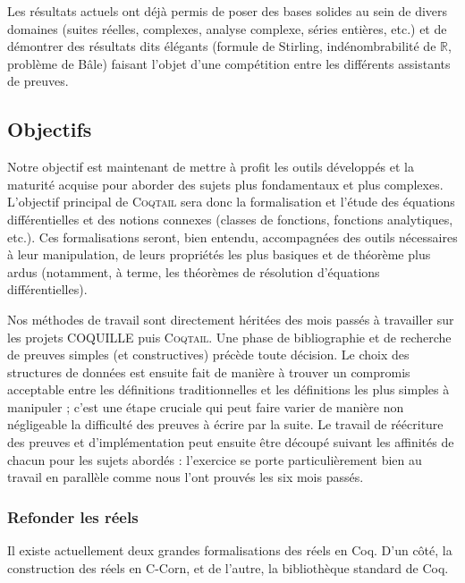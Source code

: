 \documentclass[11pt]{article}
\newcommand{\coqtail}{\textsc{Coqtail}}
\begin{document}
Les résultats actuels ont déjà permis de poser des bases solides au sein de divers domaines (suites réelles, complexes, analyse complexe, séries entières, etc.) et de démontrer des résultats dits élégants (formule de Stirling, indénombrabilité de $\mathbb{R}$, problème de Bâle) faisant l'objet d'une compétition entre les différents assistants de preuves\cite{Freek}.


\subsection{Objectifs}

Notre objectif est maintenant de mettre à profit les outils développés et la maturité acquise pour aborder des sujets plus fondamentaux et plus complexes. L'objectif principal de \coqtail{} sera donc la formalisation et l'étude des équations différentielles et des notions connexes (classes de fonctions, fonctions analytiques, etc.). Ces formalisations seront, bien entendu, accompagnées des outils nécessaires à leur manipulation, de leurs propriétés les plus basiques et de théorème plus ardus (notamment, à terme, les théorèmes de résolution d'équations différentielles).

Nos méthodes de travail sont directement héritées des mois passés à travailler sur les projets COQUILLE puis \coqtail{}. Une phase de bibliographie et de recherche de preuves simples (et constructives) précède toute décision. Le choix des structures de données est ensuite fait de manière à trouver un compromis acceptable entre les définitions traditionnelles et les définitions les plus simples à manipuler ; c'est une étape cruciale qui peut faire varier de manière non négligeable la difficulté des preuves à écrire par la suite. Le travail de réécriture des preuves et d'implémentation peut ensuite être découpé suivant les affinités de chacun pour les sujets abordés : l'exercice se porte particulièrement bien au travail en parallèle comme nous l'ont prouvés les six mois passés.

\subsubsection{Refonder les réels}

Il existe actuellement deux grandes formalisations des réels en Coq. D'un côté, la construction des réels en C-Corn, et de l'autre, la bibliothèque standard de Coq.
\end{document}
